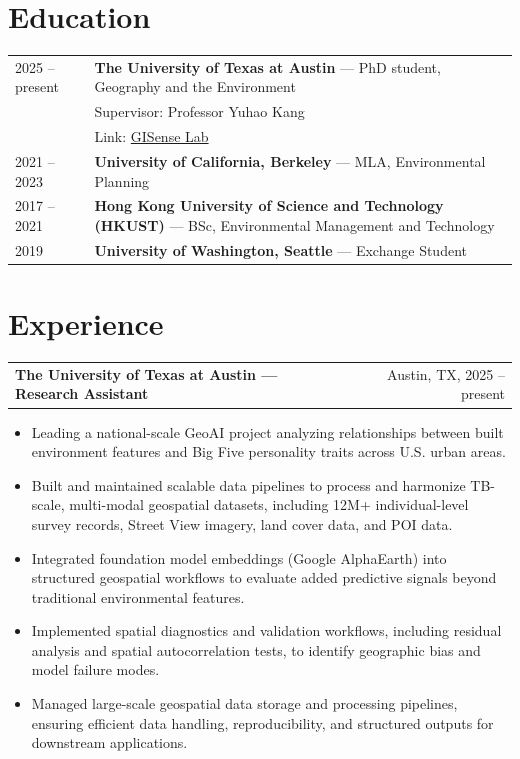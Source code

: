 \documentclass[a4paper,12pt]{article}
\makeatletter
\newenvironment{joblong}[2]
{
\begin{tabularx}{\linewidth}{@{}l X r@{}}
\textbf{#1} & \hfill &  #2 \\[3.75pt]
\end{tabularx}
\begin{minipage}[t]{\linewidth}
\begin{itemize}[nosep,after=\strut,leftmargin=1.2em,itemsep=3pt,label=--]
}
{
\end{itemize}
\end{minipage}
}
\makeatother
\begin{document}
\section{Education}
\begin{tabularx}{\linewidth}{@{}l X@{}}
2025 -- present &
\textbf{The University of Texas at Austin} --- PhD student, Geography and the Environment \\
& Supervisor: Professor Yuhao Kang \\
& Link: \href{https://sites.utexas.edu/gisense/}{GISense Lab}\\[3pt]

2021 -- 2023 &
\textbf{University of California, Berkeley} --- MLA, Environmental Planning \\[3pt]

2017 -- 2021 &
\textbf{Hong Kong University of Science and Technology (HKUST)} --- BSc, Environmental Management and Technology \\[3pt]

2019 &
\textbf{University of Washington, Seattle} --- Exchange Student \\
\end{tabularx}

\section{Experience}

\begin{joblong}{The University of Texas at Austin --- Research Assistant}{Austin, TX, 2025 -- present}
\item Leading a national-scale GeoAI project analyzing relationships between built environment features and Big Five personality traits across U.S. urban areas.
\item Built and maintained scalable data pipelines to process and harmonize TB-scale, multi-modal geospatial datasets, including 12M+ individual-level survey records, Street View imagery, land cover data, and POI data.
\item Integrated foundation model embeddings (Google AlphaEarth) into structured geospatial workflows to evaluate added predictive signals beyond traditional environmental features.
\item Implemented spatial diagnostics and validation workflows, including residual analysis and spatial autocorrelation tests, to identify geographic bias and model failure modes.
\item Managed large-scale geospatial data storage and processing pipelines, ensuring efficient data handling, reproducibility, and structured outputs for downstream applications.
\end{joblong}
\end{document}
